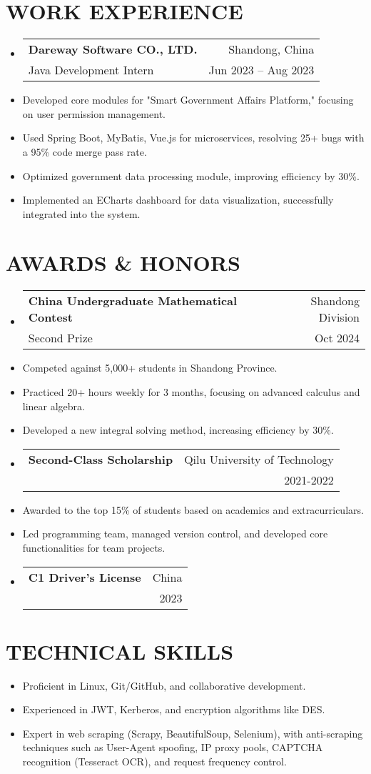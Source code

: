 \documentclass[a4paper,11pt]{article}
\makeatletter
\newenvironment{resumeList}{\begin{itemize}[leftmargin=*,label={}]}{\end{itemize}}
\newcommand{\resumeItem}[1]{\item\small{#1}}
\newcommand{\resumeEntry}[4]{
  \item \begin{tabular*}{0.97\textwidth}{l@{\extracolsep{\fill}}r}
    \textbf{#1} & #2 \\
    #3 & #4 \\
  \end{tabular*}
}
\makeatother
\begin{document}
\section{WORK EXPERIENCE}
\begin{resumeList}
    \resumeEntry{Dareway Software CO., LTD.}
    {Shandong, China}
    {Java Development Intern}
    {Jun 2023 -- Aug 2023}

    \resumeItem{Developed core modules for "Smart Government Affairs Platform," focusing on user permission management.}
    \resumeItem{Used Spring Boot, MyBatis, Vue.js for microservices, resolving 25+ bugs with a 95\% code merge pass rate.}
    \resumeItem{Optimized government data processing module, improving efficiency by 30\%.}
    \resumeItem{Implemented an ECharts dashboard for data visualization, successfully integrated into the system.}
\end{resumeList}

\section{AWARDS \& HONORS}
\begin{resumeList}
    \resumeEntry{China Undergraduate Mathematical Contest}
    {Shandong Division}
    {Second Prize}
    {Oct 2024}

    \resumeItem{Competed against 5,000+ students in Shandong Province.}
    \resumeItem{Practiced 20+ hours weekly for 3 months, focusing on advanced calculus and linear algebra.}
    \resumeItem{Developed a new integral solving method, increasing efficiency by 30\%.}
    \pagebreak
    \resumeEntry{Second-Class Scholarship}
    {Qilu University of Technology}
    {}
    {2021-2022}

    \resumeItem{Awarded to the top 15\% of students based on academics and extracurriculars.}
    \resumeItem{Led programming team, managed version control, and developed core functionalities for team projects.}
    \resumeEntry{C1 Driver's License}
{China}
{}
{2023}
\end{resumeList}

\section{TECHNICAL SKILLS}
\begin{resumeList}
    \resumeItem{Proficient in Linux, Git/GitHub, and collaborative development.}
    \resumeItem{Experienced in JWT, Kerberos, and encryption algorithms like DES.}
    \resumeItem{Expert in web scraping (Scrapy, BeautifulSoup, Selenium), with anti-scraping techniques such as User-Agent spoofing, IP proxy pools, CAPTCHA recognition (Tesseract OCR), and request frequency control.}
\end{resumeList}
\end{document}
